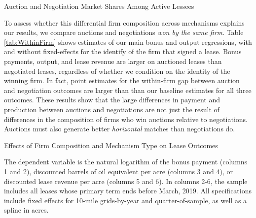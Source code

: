 \documentclass[12pt]{article}
\begin{document}
\begin{table}[htbp]
\begin{center}
\begin{threeparttable}
\caption{Auction and Negotiation Market Shares Among Active Lessees}
\label{tab:table_allocative}
 	\small
   	            
\end{threeparttable}
\end{center}
\end{table}

To assess whether this differential firm composition across mechanisms explains our results, we compare auctions and negotiations \textit{won by the same firm}.  Table \ref{tab:WithinFirm} shows estimates of our main bonus and output regressions, with and without fixed-effects for the identify of the firm that signed a lease.  Bonus payments, output, and lease revenue are larger on auctioned leases than negotiated leases, regardless of whether we condition on the identity of the winning firm.  In fact, point estimates for the within-firm gap between auction and negotiation outcomes are larger than than our baseline estimates for all three outcomes.  These results show that the large differences in payment and production between auctions and negotiations are not just the result of differences in the composition of firms who win auctions relative to negotiations. Auctions must also generate better \textit{horizontal} matches than negotiations do.  

\begin{table}[htbp]
	\begin{center}
	\begin{threeparttable}
	\caption{Effects of Firm Composition and Mechanism Type on Lease Outcomes}
	\label{tab:WithinFirm}
	\small
	    
		\begin{tablenotes}
			\footnotesize
			\item The dependent variable is the natural logarithm of the bonus payment (columns 1 and 2), discounted barrels of oil equivalent per acre (columns 3 and 4), or discounted lease revenue per acre (columns 5 and 6).  In columns 2-6, the sample includes all leases whose primary term ends before March, 2019.  All specifications include fixed effects for 10-mile grids-by-year and quarter-of-sample, as well as a spline in acres.   
			\end{tablenotes}        
	\end{threeparttable}
	\end{center}
\end{table}
\end{document}
